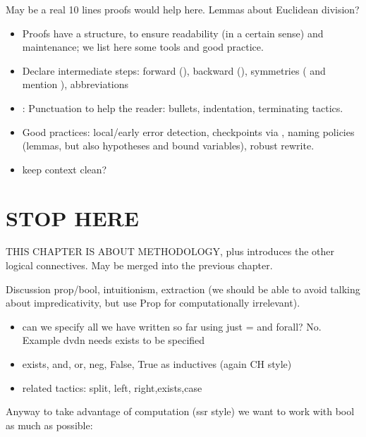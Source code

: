 May be a real 10 lines proofs would help here. Lemmas about Euclidean
division?
 \begin{itemize}
\item Proofs have a structure, to ensure readability (in a certain
  sense) and maintenance; we list here some tools and good practice.
\item Declare intermediate steps: forward (), backward
  (), symmetries ( and mention ),
abbreviations 
\item: Punctuation to help the reader: bullets, indentation,
  terminating tactics.
\item Good practices: local/early error detection, checkpoints via
  , naming policies (lemmas, but also hypotheses and bound
  variables), robust rewrite.
\item keep context clean?
\end{itemize}

\section{STOP HERE}

THIS CHAPTER IS ABOUT METHODOLOGY, plus introduces the other logical
connectives. May be merged into the previous chapter.


%

Discussion prop/bool, intuitionism, extraction (we should be able to
avoid talking about impredicativity, but use Prop for computationally
irrelevant).


\begin{itemize}
\item can we specify all we have written so far using just = and forall? No.
	Example dvdn needs exists to be specified
\item exists, and, or, neg, False, True as inductives (again CH style)
\item related tactics: split, left, right,exists,case
\end{itemize}

Anyway to take advantage of computation (ssr style) we want to
work with bool as much as possible:


